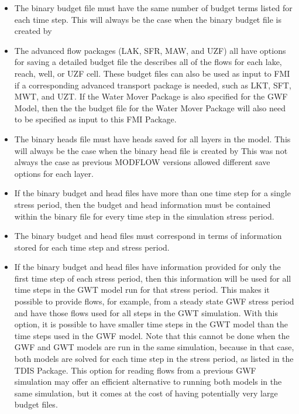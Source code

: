 \begin{itemize}
\begin{itemize}
\item The binary budget file must have the same number of budget terms listed for each time step.  This will always be the case when the binary budget file is created by \mfdot
\item The advanced flow packages (LAK, SFR, MAW, and UZF) all have options for saving a detailed budget file the describes all of the flows for each lake, reach, well, or UZF cell.  These budget files can also be used as input to FMI if a corresponding advanced transport package is needed, such as LKT, SFT, MWT, and UZT.  If the Water Mover Package is also specified for the GWF Model, then the the budget file for the Water Mover Package will also need to be specified as input to this FMI Package.
\item The binary heads file must have heads saved for all layers in the model.  This will always be the case when the binary head file is created by \mfdot  This was not always the case as previous MODFLOW versions allowed different save options for each layer.
\item If the binary budget and head files have more than one time step for a single stress period, then the budget and head information must be contained within the binary file for every time step in the simulation stress period.
\item The binary budget and head files must correspond in terms of information stored for each time step and stress period.
\item If the binary budget and head files have information provided for only the first time step of each stress period, then this information will be used for all time steps in the GWT model run for that stress period.  This makes it possible to provide flows, for example, from a steady state GWF stress period and have those flows used for all steps in the GWT simulation.  With this option, it is possible to have smaller time steps in the GWT model than the time steps used in the GWF model.  Note that this cannot be done when the GWF and GWT models are run in the same simulation, because in that case, both models are solved for each time step in the stress period, as listed in the TDIS Package.  This option for reading flows from a previous GWF simulation may offer an efficient alternative to running both models in the same simulation, but it comes at the cost of having potentially very large budget files.
\end{itemize}

\end{itemize}

